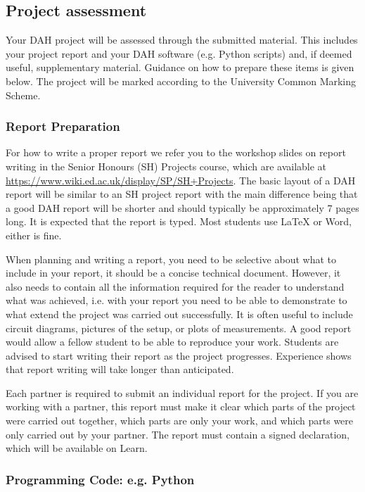 \subsection{Project assessment}

Your DAH project will be assessed through the submitted material. This includes your project report and your DAH software (e.g. Python scripts) and, if deemed useful, supplementary material. Guidance on how to prepare these items is given below. The project will be marked according to the University Common Marking Scheme. 

\subsubsection{Report Preparation}

For how to write a proper report we refer you to the workshop slides on report writing in the Senior Honours  (SH) Projects course, which are available at
\url{https://www.wiki.ed.ac.uk/display/SP/SH+Projects}.
The basic layout of a DAH report will be similar to an SH project report with the main difference being that a good DAH report will be shorter and should typically be approximately 7  pages long. It is expected that the report is typed. Most students use LaTeX or Word, either is fine.

When planning and writing a report, you need to be selective about what to include in your report, it should be a concise technical document. However, it also needs to contain all the information required for the reader to understand what was achieved, i.e. with your report you need to be able to demonstrate to what extend the project was carried out successfully. It is often useful to include circuit diagrams, pictures of the setup, or plots of measurements. A good report would allow a fellow student to be able to reproduce your work. Students are advised to start writing their report as the project progresses. Experience shows that report writing  will take longer than anticipated.

Each partner is required to submit an individual report for the project. If you are working with a partner, this report must make it clear which parts of the project were carried out together, which parts are only your work, and which parts were only carried out by your partner. The report must contain a signed declaration, which will be available on Learn.

\subsubsection{Programming Code: e.g. Python}

